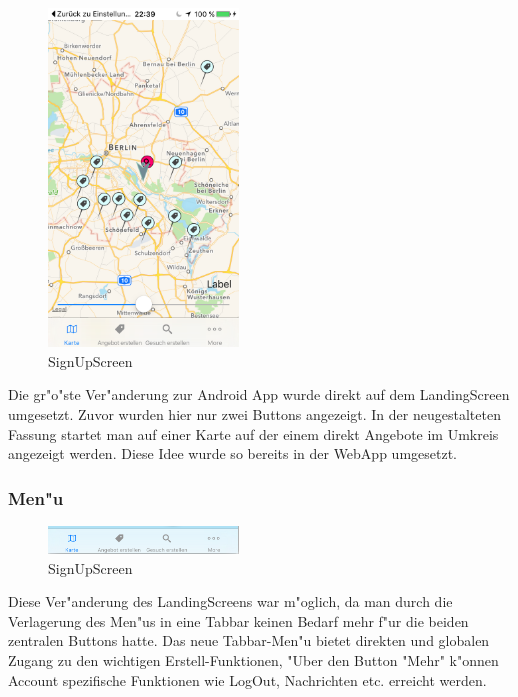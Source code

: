 \begin{figure}[H]
\begin{center}
\includegraphics[width=0.45\textwidth]{./Bilder/startscreen.png}
\caption{SignUpScreen}
\label{fig:ioslogin}
\end{center}
\end{figure}

Die gr"o"ste Ver"anderung zur Android App wurde direkt auf dem LandingScreen umgesetzt. Zuvor wurden hier nur zwei  Buttons angezeigt. 
In der neugestalteten Fassung startet man auf einer Karte auf der einem direkt Angebote im Umkreis angezeigt werden. 
Diese Idee wurde so bereits in der WebApp umgesetzt. 

\subsubsection*{Men"u}

\begin{figure}[H]
\begin{center}
\includegraphics[width=0.45\textwidth]{./Bilder/tabmenu.png}
\caption{SignUpScreen}
\label{fig:ioslogin}
\end{center}
\end{figure}

Diese Ver"anderung des LandingScreens war m"oglich, da man durch die Verlagerung des Men"us in eine Tabbar keinen Bedarf mehr f"ur die beiden zentralen Buttons hatte. 
Das neue Tabbar-Men"u bietet direkten und globalen Zugang zu den wichtigen Erstell-Funktionen, "Uber den Button "Mehr" k"onnen Account spezifische Funktionen wie LogOut, Nachrichten etc. erreicht werden.

